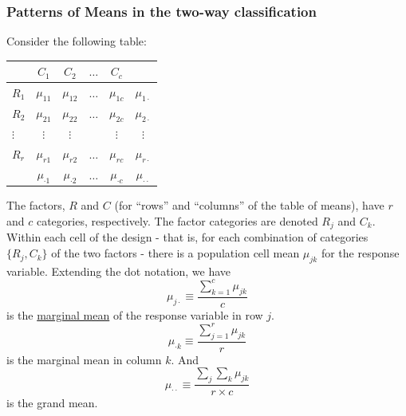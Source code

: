 \subsubsection*{Patterns of Means in the two-way classification}
Consider the following table:
	\begin{table}[H]
	\renewcommand{\arraystretch}{1.5}
	\centering
	\begin{tabular}{l|cccc|c}
		\toprule
		 & $C_1$ & $C_2$ & $\dots$ &$C_c$ & \\
		\hline
		$R_1$ & $\mu_{11}$ & $\mu_{12}$ & $\dots$ & $\mu_{1c}$  & $\mu_{1\cdot}$\\
		$R_2$ & $\mu_{21}$ & $\mu_{22}$ & $\dots$ & $\mu_{2c}$  & $\mu_{2\cdot}$\\
		$\vdots$ & $\vdots$ & $\vdots$ &  & $\vdots$  & $\vdots$\\
		$R_r$ & $\mu_{r1}$ & $\mu_{r2}$ & $\dots$ & $\mu_{rc}$  & $\mu_{r\cdot}$\\				
		\hline
		 & $\mu_{\cdot 1}$ & $\mu_{\cdot 2}$ & $\dots$ & $\mu_{\cdot c}$  & $\mu_{\cdot \cdot}$\\				
		\bottomrule
	\end{tabular}
\end{table}
The factors, $R$ and $C$ (for ``rows'' and ``columns'' of the table of means), have $r$ and $c$ categories, respectively.
The factor categories are denoted $R_j$ and $C_k$.
Within each cell of the design - that is, for each combination of categories $\{R_j, C_k\}$ of the two factors - there is a population cell mean $\mu_{jk}$ for the response variable.
Extending the dot notation, we have
$$
\mu_{j\cdot} \equiv \frac{\sum_{k = 1}^{c} \mu_{jk}}{c}
$$
is the \underline{marginal mean} of the response variable in row $j$.
$$
\mu_{\cdot k} \equiv \frac{\sum_{j = 1}^{r} \mu_{jk}}{r}
$$
is the marginal mean in column $k$. And
$$
\mu_{\cdot \cdot} \equiv \frac{\sum_j \sum_k \mu_{jk}}{r \times c}
$$
is the grand mean.

